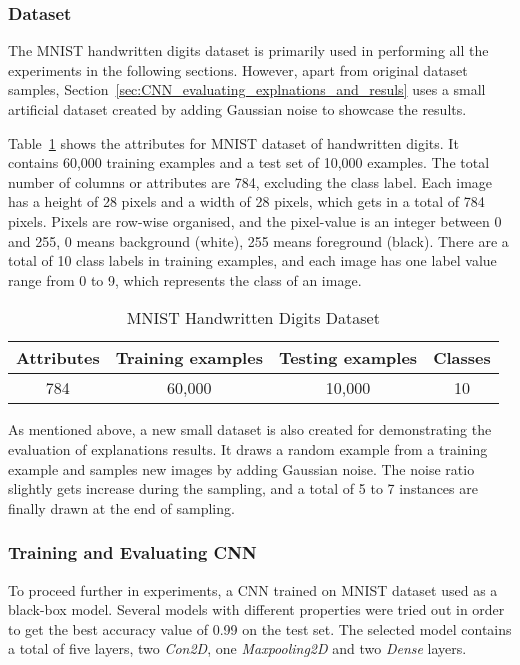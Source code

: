 \documentclass[english]{tktltiki2}
\theoremstyle{definition}
\theoremstyle{remark}
\begin{document}
\subsubsection{Dataset}\label{sec:dataset_MNIST}
The MNIST handwritten digits dataset is primarily used in performing all the experiments in the following sections. However, apart from original dataset samples, Section~\ref{sec:CNN_evaluating_explnations_and_resuls} uses a small artificial dataset created by adding Gaussian noise to showcase the results.

Table~\ref{table:datasets_MNIST} shows the attributes for MNIST dataset of handwritten digits. It contains 60,000 training examples and a test set of 10,000 examples. The total number of columns or attributes are 784, excluding the class label. Each image has a height of 28 pixels and a width of 28 pixels, which gets in a total of 784 pixels. Pixels are row-wise organised, and the pixel-value is an integer between 0 and 255, 0 means background (white), 255 means foreground (black). There are a total of 10 class labels in training examples, and each image has one label value range from  0 to 9, which represents the class of an image.

\begin{table}[H]
	\caption{MNIST Handwritten Digits Dataset }
	\label{table:datasets_MNIST}
	\begin{center}
		\begin{tabular}{|c|c|c|c|}
			\hline	
			\textbf{Attributes} & \textbf{Training examples} & \textbf{Testing examples} & \textbf{Classes} \\ \hline
			784 & 60,000 & 10,000 & 10 \\ \hline
		\end{tabular}
	\end{center}
\end{table}

As mentioned above, a new small dataset is also created for demonstrating the evaluation of explanations results. It draws a random example from a training example and samples new images by adding Gaussian noise. The noise ratio slightly gets increase during the sampling, and a total of 5 to 7 instances are finally drawn at the end of sampling.

\subsubsection{Training and Evaluating CNN}
To proceed further in experiments, a CNN trained on MNIST dataset used as a black-box model. Several models with different properties were tried out in order to get the best accuracy value of 0.99 on the test set. The selected model contains a total of five layers, two \textit{Con2D}, one \textit{Maxpooling2D} and two \textit{Dense} layers.
\end{document}
